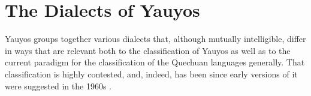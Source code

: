 \vfill
\null

\newpage
\section{The Dialects of Yauyos}\label{sec:dialectsofyauyos}
Yauyos groups together various dialects that, although mutually intelligible, differ in ways that are relevant both to the classification of Yauyos as well as to the current paradigm for the classification of the Quechuan languages generally. That classification is highly contested, and, indeed, has been since early versions of it were suggested in the 1960s \citep[See in particular][]{Landerman91}.

